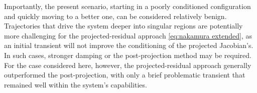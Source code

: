 \documentclass[../main.tex]{subfiles}
\begin{document}

Importantly, the present scenario, starting in a poorly conditioned configuration and quickly moving to a better one, can be considered relatively benign. Trajectories that drive the system deeper into singular regions are potentially more challenging for the projected-residual approach \eqref{eq:nakamura extended}, as an initial transient will not improve the conditioning of the projected Jacobian's. In such cases, stronger damping or the post-projection method may be required. For the case considered here, however, the projected-residual approach generally outperformed the post-projection, with only a brief problematic transient that remained well within the system's capabilities.
\end{document}
